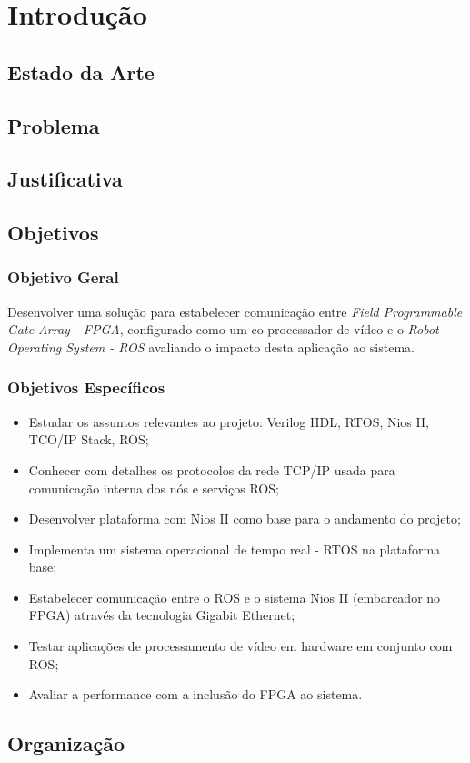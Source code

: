 \chapter{Introdução}

\section{Estado da Arte}

\section{Problema}

\section{Justificativa}

\section{Objetivos}

\subsection{Objetivo Geral}

Desenvolver uma solução para estabelecer comunicação entre \textit{Field Programmable
Gate Array - FPGA}, configurado como um co-processador de vídeo e o  \textit{Robot Operating
System - ROS} avaliando o impacto desta aplicação ao sistema.

\subsection{Objetivos Específicos}

\begin{itemize}
    \item Estudar os assuntos relevantes ao projeto: Verilog HDL, RTOS, Nios II, TCO/IP Stack, ROS;
    \item Conhecer com detalhes os protocolos da rede TCP/IP usada para comunicação interna dos nós e serviços ROS;
    \item Desenvolver plataforma com Nios II como base para o andamento do projeto;
    \item Implementa um sistema operacional de tempo real - RTOS na plataforma base;
    \item Estabelecer comunicação entre o ROS e o sistema Nios II (embarcador no FPGA) através da tecnologia Gigabit Ethernet;
    \item Testar aplicações de processamento de vídeo em hardware em conjunto com ROS;
    \item Avaliar a performance com a inclusão do FPGA ao sistema.
\end{itemize}


\section{Organização}



